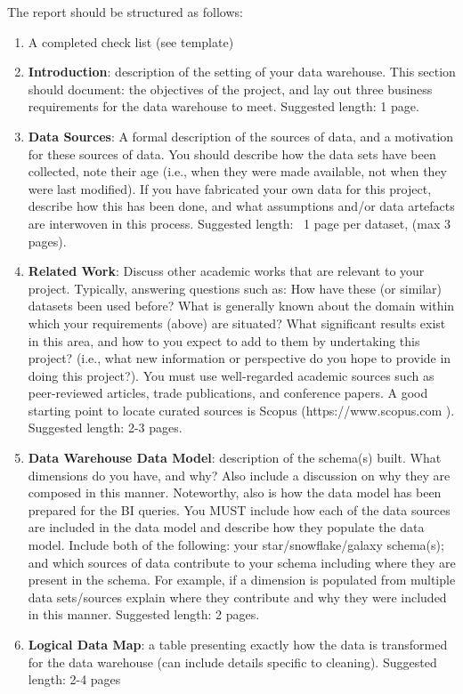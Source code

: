 \documentclass{article}[a4paper,12pt]
\begin{document}
The report should be structured as follows:
\begin{enumerate}
\item A completed check list (see template)
\item \textbf{Introduction}: description of the setting of your data warehouse. This section should document: the objectives of the project, and lay out three business requirements for the data warehouse to meet. Suggested length: 1 page.
\item \textbf{Data Sources}: A formal description of the sources of data, and a motivation for these sources of data. You should describe how the data sets have been collected, note their age (i.e., when they were made available, not when they were last modified). If you have fabricated your own data for this project, describe how this has been done, and what assumptions and/or data artefacts are interwoven in this process. Suggested length: ~1 page per dataset, (max 3 pages).
\item \textbf{Related Work}: Discuss other academic works that are relevant to your project. Typically, answering questions such as: How have these (or similar) datasets been used before? What is generally known about the domain within which your requirements (above) are situated? What significant results exist in this area, and how to you expect to add to them by undertaking this project? (i.e., what new information or perspective do you hope to provide in doing this project?). You must use well-regarded academic sources such as peer-reviewed articles, trade publications, and conference papers. A good starting point to locate curated sources is Scopus (https://www.scopus.com ). Suggested length: 2-3 pages.
\item \textbf{Data Warehouse Data Model}: description of the schema(s) built. What dimensions do you have, and why? Also include a discussion on why they are composed in this manner. Noteworthy, also is how the data model has been prepared for the BI queries. You MUST include how each of the data sources are included in the data model and describe how they populate the data model. Include both of the following: your star/snowflake/galaxy schema(s); and which sources of data contribute to your schema including where they are present in the schema. For example, if a dimension is populated from multiple data sets/sources explain where they contribute and why they were included in this manner. Suggested length: 2 pages.
\item \textbf{Logical Data Map}: a table presenting exactly how the data is transformed for the data warehouse (can include details specific to cleaning). Suggested length: 2-4 pages

\end{enumerate}
\end{document}

